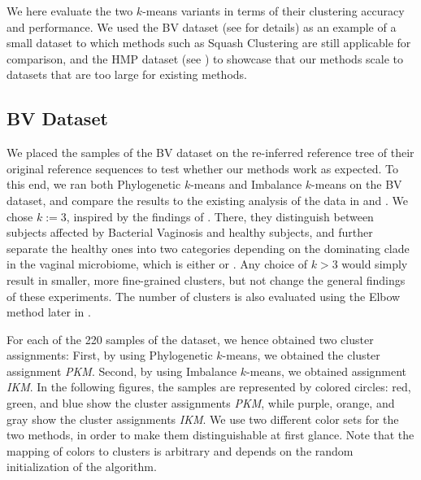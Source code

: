 We here evaluate the two $k$-means variants in terms of their clustering accuracy and performance.
We used the \acf{BV} dataset (see  for details)
as an example of a small dataset to which methods such as Squash Clustering \cite{Matsen2011a}
are still applicable for comparison,
and the \acf{HMP} dataset (see )
to showcase that our methods scale to datasets that are too large for existing methods.


\subsection{BV Dataset}
\label{ch:Clustering:sec:Results:sub:BVDataset}

We placed the samples of the \ac{BV} dataset \cite{Srinivasan2012}
on the re-inferred reference tree of their original reference sequences
to test whether our methods work as expected.
To this end, we ran both Phylogenetic $k$-means and Imbalance $k$-means on the \ac{BV} dataset,
and compare the results to the existing analysis of the data in \cite{Srinivasan2012} and \cite{Matsen2011a}.
We chose $k:=3$, inspired by the findings of \cite{Srinivasan2012}.
There, they distinguish between subjects affected by Bacterial Vaginosis and healthy subjects,
and further separate the healthy ones into two categories depending on the dominating clade in the vaginal microbiome,
which is either  or .
Any choice of $k > 3$ would simply result in smaller, more fine-grained clusters,
but not change the general findings of these experiments.
The number of clusters is also evaluated using the Elbow method later in .

For each of the \num{220} samples of the dataset, we hence obtained two cluster assignments:
First, by using Phylogenetic $k$-means, we obtained the cluster assignment \emph{PKM}.
Second, by using Imbalance $k$-means, we obtained assignment \emph{IKM}.
In the following figures, the samples are represented by colored circles:
red, green, and blue show the cluster assignments \emph{PKM},
while purple, orange, and gray show the cluster assignments \emph{IKM}.
We use two different color sets for the two methods, in order to make them distinguishable at first glance.
Note that the mapping of colors to clusters is arbitrary and depends on the random initialization of the algorithm.

